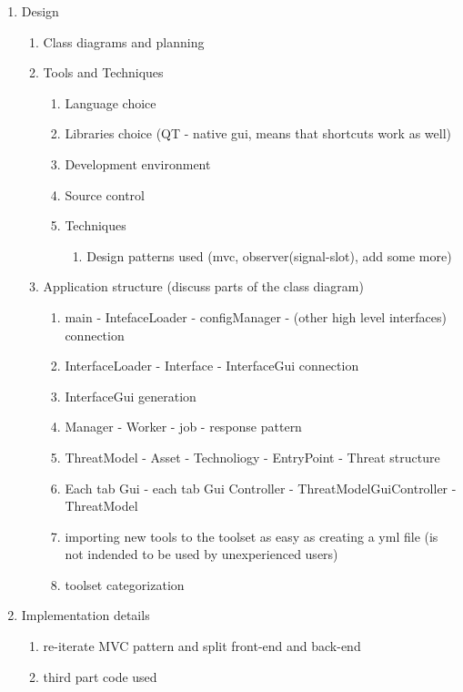 \begin{enumerate}
	\item Design
	\begin{enumerate}
		\item Class diagrams and planning
			\item Tools and Techniques
			\begin{enumerate}
				\item Language choice
				\item Libraries choice (QT - native gui, means that shortcuts work as well)
				\item Development environment
				\item Source control
				\item Techniques
				\begin{enumerate}
					\item Design patterns used (mvc, observer(signal-slot), add some more)
				\end{enumerate}
			\end{enumerate}
		\item Application structure (discuss parts of the class diagram)
		\begin{enumerate}
			\item main - IntefaceLoader - configManager - (other high level interfaces) connection
			\item InterfaceLoader - Interface - InterfaceGui connection
			\item InterfaceGui generation
			\item Manager - Worker - job - response pattern
			\item ThreatModel - Asset - Technoliogy - EntryPoint - Threat structure
			\item Each tab Gui - each tab Gui Controller - ThreatModelGuiController - ThreatModel
			
		\item importing new tools to the toolset as easy as creating a yml file (is not indended to be used by unexperienced users)
		\item toolset categorization
	\end{enumerate}
			
	\end{enumerate}

	\item Implementation details
	\begin{enumerate}
		\item re-iterate MVC pattern and split front-end and back-end 
		
		\item third part code used
		

\end{enumerate}
\end{enumerate}
